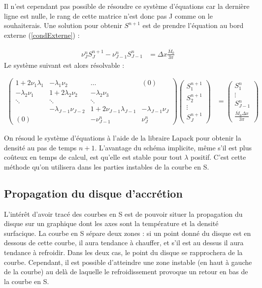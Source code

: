 \documentclass[a4paper,12pt]{article}
\begin{document}
Il n'est cependant pas possible de résoudre ce système d'équations car la dernière ligne est nulle, le rang de cette matrice n'est donc pas J comme on le souhaiterais. Une solution pour obtenir $S^{n+1}$ est de prendre l'équation au bord externe (\ref{condExterne}) :

\begin{align}
	\nu_J^nS^{n+1}_J - \nu_{J-1}^nS_{J-1}^n &= \Delta x \frac{\dot{M_0}}{3\pi}
\end{align}
Le système suivant est alors résolvable :

\begin{align}
 \begin{pmatrix}1 + 2\nu_1\lambda_1& -\lambda_1\nu_2 & \ldots & (0) \\
	-\lambda_2\nu_1 & 1 + 2\lambda_2\nu_2 &- \lambda_2\nu_3 & \\
	 \ddots& \ddots& \ddots &\\
	  &- \lambda_{J-1}\nu_{J-2} & 1 + 2\nu_{J-1}\lambda_{J-1} &- \lambda_{J-1}\nu_{J}\\
	  (0) &  & -\nu^n_{J-1} & \nu^n_J
 \end{pmatrix}
 \begin{pmatrix}
 S_1^{n+1}\\
 S_2^{n+1}\\
 \vdots\\
 S_J^{n+1}
 \end{pmatrix}
 &=
 \begin{pmatrix}
 S_1^n\\
 \vdots\\
 S_{J-1}^n\\
 \frac{\dot{M_0}\Delta x}{3\pi}
 \end{pmatrix}
 \end{align}

On résoud le système d'équations à l'aide de la libraire Lapack pour obtenir la densité au pas de temps $n+1$. L'avantage du schéma implicite, même s'il est plus coûteux en temps de calcul, est qu'elle est stable pour tout $\lambda$ positif. C'est cette méthode qu'on utilisera dans les parties instables de la courbe en S.

\subsection{Propagation du disque d'accrétion}

L'intérêt d'avoir tracé des courbes en S est de pouvoir situer la propagation du disque sur un graphique dont les axes sont la température et la densité surfacique. La courbe en S sépare deux zones : si un point donné du disque est en dessous de cette courbe, il aura tendance à chauffer, et s'il est au dessus il aura tendance à refroidir. Dans les deux cas, le point du disque se rapprochera de la courbe. Cependant, il est possible d'atteindre une zone instable (en haut à gauche de la courbe) au delà de laquelle le refroidissement provoque un retour en bas de la courbe en S.
\end{document}
